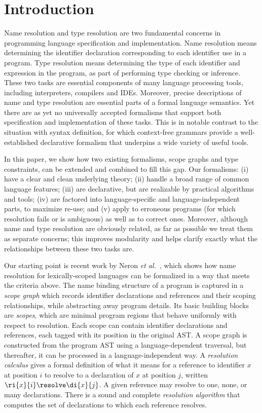 \section{Introduction}

Name resolution and type resolution are two fundamental concerns in programming
language specification and implementation.
Name resolution means determining the identifier declaration corresponding to
each identifier use in a program.  Type resolution means determining the type of
each identifier and expression in the program, as part of performing type
checking or inference.
These two tasks are essential components of many language processing tools,
including interpreters, compilers and IDEs. Moreover, precise descriptions of
name and type resolution are essential parts of a formal language semantics.
Yet there are as yet no universally accepted formalisms that support both
specification and implementation of these tasks.
This is in notable contrast to the situation with syntax definition, for which
context-free grammars provide a well-established declarative formalism that
underpins a wide variety of useful tools.

In this paper, we show how two existing formalisms, scope graphs and type
constraints, can be extended and combined to fill this gap.
Our formalisms: (i) have a clear and clean underlying theory; (ii) handle a
broad range of common language features; (iii) are declarative, but are
realizable by practical algorithms and tools; (iv) are factored into
language-specific and language-independent parts, to maximize re-use; and (v)
apply to erroneous programs (for which resolution fails or is ambiguous) as well
as to correct ones.   Moreover, although name and type resolution are obviously
related, as far as possible we treat them as separate concerns; this improves
modularity and helps clarify exactly what the relationships between these two
tasks are.

Our starting point is recent work by Neron {\it et
al.}~\cite{NeronTVW-ESOP-2015}, which shows how name resolution for
lexically-scoped languages can be formalized in a way that meets the criteria
above.  The name binding structure of a program is captured in a {\it scope
graph} which records identifier declarations and references and their scoping
relationships, while abstracting away program details.  Its basic building
blocks are {\it scopes}, which are minimal program regions that behave uniformly
with respect to resolution.  Each scope can contain identifier declarations and
references, each tagged with its position in the original AST.
A scope graph is constructed from the program AST using a language-dependent
traversal, but thereafter, it can be processed in a language-independent way.  A
{\it resolution calculus} gives a formal definition of what it means for a
reference to identifier $x$ at position $i$ to resolve to a declaration of $x$
at position $j$, written $\ri{x}{i}\resolve\di{x}{j}$.
A given reference may resolve to one, none, or many declarations.  There is a
sound and complete {\it resolution algorithm} that computes the set of
declarations to which each reference resolves.

